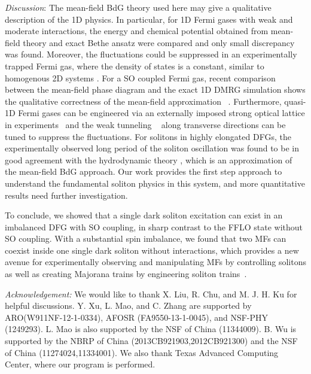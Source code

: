 \documentclass[prl,aps,twocolumn,showpacs, floatfix]{revtex4}
\begin{document}
\emph{Discussion}: The mean-field BdG theory used here may give a
qualitative description of the 1D physics. In particular, for 1D Fermi gases
with weak and moderate interactions, the energy and chemical potential
obtained from mean-field theory and exact Bethe ansatz were compared \cite%
{HuHui2007PRA} and only small discrepancy was found. Moreover, the
fluctuations could be suppressed in an experimentally trapped Fermi gas,
where the density of states is a constant, similar to homogenous 2D systems
\cite{HuHui2007PRA}. For a SO coupled Fermi gas, recent comparison between
the mean-field phase diagram and the exact 1D DMRG simulation shows the
qualitative correctness of the mean-field approximation~\cite{GangChenArxiv}%
. Furthermore, quasi-1D Fermi gases can be engineered via an externally
imposed strong optical lattice in experiments~\cite{Hulet2010Nature} and the
weak tunneling ~\cite{Parish2007PRL,Kuei2012PRA,Qu2014MChain} along
transverse directions can be tuned to suppress the fluctuations. For
solitons in highly elongated DFGs, the experimentally observed long period
of the soliton oscillation was found to be in good agreement with the
hydrodynamic theory \cite{Martin2013Nature}, which is an approximation of
the mean-field BdG approach. Our work provides the first step approach to
understand the fundamental soliton physics in this system, and more
quantitative results need further investigation.

To conclude, we showed that a single dark soliton excitation can exist in an
imbalanced DFG with SO coupling, in sharp contrast to the FFLO state without
SO coupling. With a substantial spin imbalance, we found that two MFs can
coexist inside one single dark soliton without interactions, which provides
a new avenue for experimentally observing and manipulating MFs by
controlling solitons as well as creating Majorana trains by engineering
soliton trains~\cite{Peter2011PRL}.

\textit{Acknowledgement:} We would like to thank X. Liu, R. Chu, and M. J.
H. Ku for helpful discussions. Y. Xu, L. Mao, and C. Zhang are supported by
ARO(W911NF-12-1-0334), AFOSR (FA9550-13-1-0045), and NSF-PHY (1249293). L.
Mao is also supported by the NSF of China (11344009). B. Wu is supported by
the NBRP of China (2013CB921903,2012CB921300) and the NSF of China
(11274024,11334001). We also thank Texas Advanced Computing Center, where
our program is performed.
\end{document}
